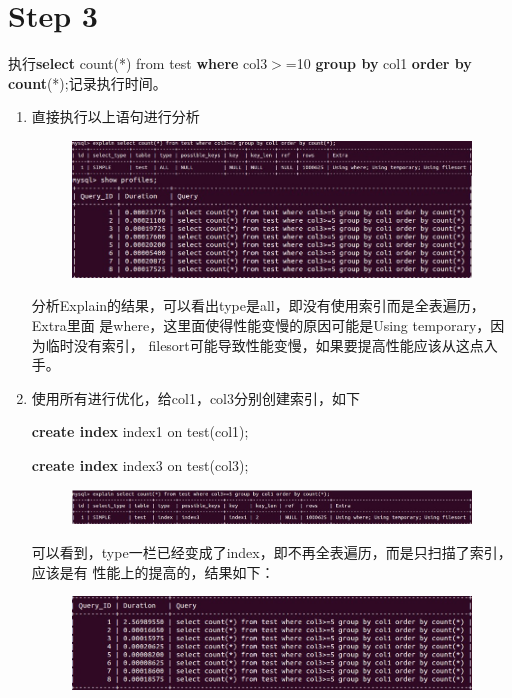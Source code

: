 \documentclass[UTF8]{ctexart}
\begin{document}
\section{Step 3}
执行\textbf{select} count(*) from test \textbf{where} col3$>$=10
\textbf{group by} col1 \textbf{order by count}(*);记录执行时间。
    \begin{enumerate}
        \item 直接执行以上语句进行分析
        \begin{figure}[ht]
            \centering
            \includegraphics[scale=0.6]{db4.jpg}
            \label{fig:db4}
        \end{figure}

        分析Explain的结果，可以看出type是all，即没有使用索引而是全表遍历，Extra里面
        是where，这里面使得性能变慢的原因可能是Using temporary，因为临时没有索引，
        filesort可能导致性能变慢，如果要提高性能应该从这点入手。
        \item 使用所有进行优化，给col1，col3分别创建索引，如下
        
        \textbf{create index} index1 on test(col1);
        
        \textbf{create index} index3 on test(col3);
        \begin{figure}[ht]
            \centering
            \includegraphics[scale=0.55]{db5.jpg}
            \label{fig:db5}
        \end{figure}
        
        可以看到，type一栏已经变成了index，即不再全表遍历，而是只扫描了索引，应该是有
        性能上的提高的，结果如下：
        \begin{figure}[ht]
            \centering
            \includegraphics[scale=0.55]{db6.jpg}
            \label{fig:db6}
        \end{figure}
        

\end{enumerate}
\end{document}
